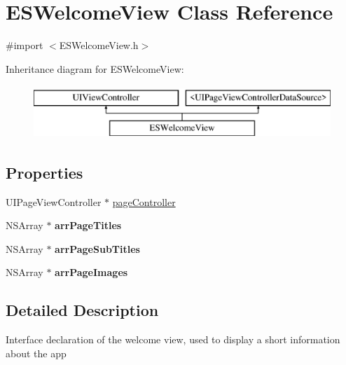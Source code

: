 \hypertarget{interface_e_s_welcome_view}{}\section{E\+S\+Welcome\+View Class Reference}
\label{interface_e_s_welcome_view}


{\ttfamily \#import $<$E\+S\+Welcome\+View.\+h$>$}

Inheritance diagram for E\+S\+Welcome\+View\+:\begin{figure}[H]
\begin{center}
\leavevmode
\includegraphics[height=2.000000cm]{interface_e_s_welcome_view}
\end{center}
\end{figure}
\subsection*{Properties}
\begin{DoxyCompactItemize}
\item 
U\+I\+Page\+View\+Controller $\ast$ \hyperlink{interface_e_s_welcome_view_a69af5615bf254612f5ce393ad01a88d6}{page\+Controller}
\item 
\hypertarget{interface_e_s_welcome_view_abf4bbc71bd8c543f233f78cea10efe63}{}N\+S\+Array $\ast$ {\bfseries arr\+Page\+Titles}\label{interface_e_s_welcome_view_abf4bbc71bd8c543f233f78cea10efe63}

\item 
\hypertarget{interface_e_s_welcome_view_a648dc31fd91b1e16d7a74fe3810e13b7}{}N\+S\+Array $\ast$ {\bfseries arr\+Page\+Sub\+Titles}\label{interface_e_s_welcome_view_a648dc31fd91b1e16d7a74fe3810e13b7}

\item 
\hypertarget{interface_e_s_welcome_view_aad6b4c6a370f839343ec30ac83a29a5a}{}N\+S\+Array $\ast$ {\bfseries arr\+Page\+Images}\label{interface_e_s_welcome_view_aad6b4c6a370f839343ec30ac83a29a5a}

\end{DoxyCompactItemize}


\subsection{Detailed Description}
Interface declaration of the welcome view, used to display a short information about the app 

